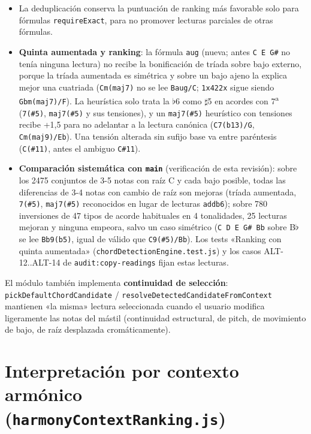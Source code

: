 \documentclass[a4paper,11pt,oneside]{report}
\newcommand{\flt}{\ensuremath{\flat}}
\newcommand{\shp}{\ensuremath{\sharp}}
\begin{document}
\begin{itemize}
\item La deduplicación conserva la puntuación de ranking más favorable solo para fórmulas \lstinline!requireExact!, para no promover lecturas parciales de otras fórmulas.
\item \textbf{Quinta aumentada y ranking}: la fórmula \lstinline!aug! (nueva; antes \lstinline!C E G#! no tenía ninguna lectura) no recibe la bonificación de tríada sobre bajo externo, porque la tríada aumentada es simétrica y sobre un bajo ajeno la explica mejor una cuatriada (\lstinline!Cm(maj7)! no se lee \lstinline!Baug/C!; \lstinline!1x422x! sigue siendo \lstinline!Gbm(maj7)/F!). La heurística solo trata la \flt6 como \shp5 en acordes con 7\textsuperscript{a} (\lstinline!7(#5)!, \lstinline!maj7(#5)! y sus tensiones), y un \lstinline!maj7(#5)! heurístico con tensiones recibe +1,5 para no adelantar a la lectura canónica (\lstinline!C7(b13)/G!, \lstinline!Cm(maj9)/Eb!). Una tensión alterada sin sufijo base va entre paréntesis (\lstinline!C(#11)!, antes el ambiguo \lstinline!C#11!).
\item \textbf{Comparación sistemática con \lstinline!main!} (verificación de esta revisión): sobre los 2475 conjuntos de 3-5 notas con raíz C y cada bajo posible, todas las diferencias de 3-4 notas con cambio de raíz son mejoras (tríada aumentada, \lstinline!7(#5)!, \lstinline!maj7(#5)! reconocidos en lugar de lecturas \lstinline!addb6!); sobre 780 inversiones de 47 tipos de acorde habituales en 4 tonalidades, 25 lecturas mejoran y ninguna empeora, salvo un caso simétrico (\lstinline!C D E G# Bb! sobre B\flt{} se lee \lstinline!Bb9(b5)!, igual de válido que \lstinline!C9(#5)/Bb!). Los tests «Ranking con quinta aumentada» (\lstinline!chordDetectionEngine.test.js!) y los casos ALT-12..ALT-14 de \lstinline!audit:copy-readings! fijan estas lecturas.
\end{itemize}

El módulo también implementa \textbf{continuidad de selección}: \lstinline!pickDefaultChordCandidate! / \lstinline!resolveDetectedCandidateFromContext! mantienen «la misma» lectura seleccionada cuando el usuario modifica ligeramente las notas del mástil (continuidad estructural, de pitch, de movimiento de bajo, de raíz desplazada cromáticamente).

\section{Interpretación por contexto armónico (\texttt{harmonyContextRanking.js})}
\label{sec:7.7}
\end{document}
